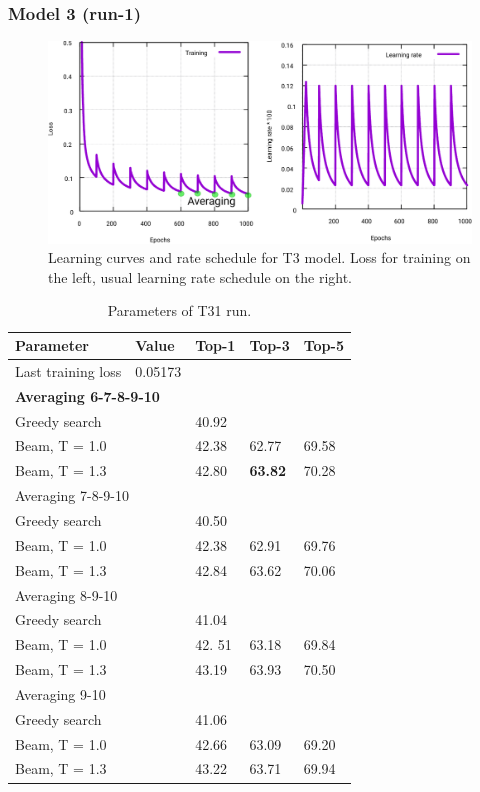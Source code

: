 \documentclass{article}
\begin{document}
 \subsubsection{Model 3 (run-1)}
 
\begin{figure}[h!]
  \centering
  \includegraphics[width = 16.5cm]{images/t3-1.pdf}
  \caption{Learning curves and rate schedule for T3 model. Loss for training on the left, usual learning rate schedule on the right.}
  \label{fig:t11}
\end{figure}

\begin{table}[h!]
\caption{Parameters of T31 run.}
  \centering
  \begin{tabular}{p{8.2cm}p{1.5cm}p{1.5cm}p{1.5cm}p{1.5cm}}
    \toprule
    Parameter & Value & Top-1 & Top-3 & Top-5 \\
    \midrule
    Last training loss & 0.05173 & & & \\
    \midrule
    \multicolumn{5}{l}{\textbf{Averaging 6-7-8-9-10}} \\ \midrule
    Greedy search  & & 40.92 & & \\
    Beam, T = 1.0  & & 42.38 & 62.77 & 69.58  \\
    Beam, T = 1.3 & & 42.80 & \textbf{63.82} & 70.28 \\ 
    \midrule
    \multicolumn{5}{l}{Averaging 7-8-9-10} \\ \midrule
    Greedy search  & & 40.50 & & \\
    Beam, T = 1.0  & & 42.38 & 62.91 & 69.76  \\
    Beam, T = 1.3 & & 42.84 & 63.62 & 70.06 \\ \midrule
    \multicolumn{5}{l}{Averaging 8-9-10} \\ \midrule
    Greedy search  & & 41.04 & & \\
    Beam, T = 1.0  & & 42. 51 & 63.18  &  69.84  \\
    Beam, T = 1.3 & & 43.19 & 63.93 & 70.50 \\ \midrule
    \multicolumn{5}{l}{Averaging 9-10} \\ \midrule
    Greedy search  & & 41.06  & & \\
    Beam, T = 1.0  & & 42.66 & 63.09 & 69.20  \\
    Beam, T = 1.3 & & 43.22 & 63.71 &  69.94\\ 
    \bottomrule
  \end{tabular}
  \label{tbl:t31}
\end{table} 
\end{document}
